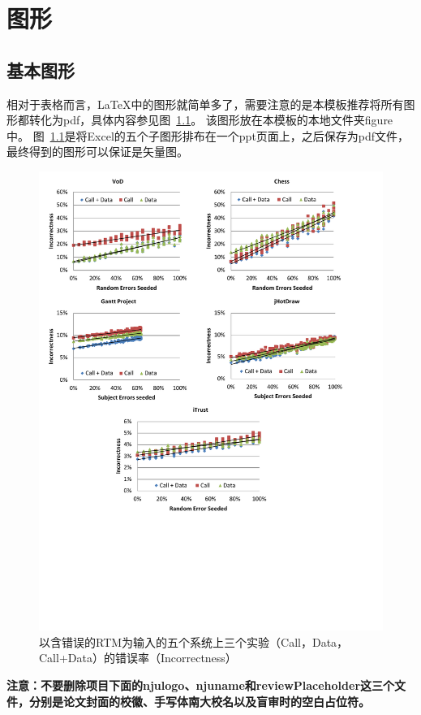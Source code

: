 \chapter{图形}

\section{基本图形}
相对于表格而言，LaTeX中的图形就简单多了，需要注意的是本模板推荐将所有图形都转化为pdf，具体内容参见图~\ref{fig_errorExpCH4}。
该图形放在本模板的本地文件夹figure中。
图~\ref{fig_errorExpCH4}是将Excel的五个子图形排布在一个ppt页面上，之后保存为pdf文件，最终得到的图形可以保证是矢量图。


\begin{figure}[htb]
  \centering
  \includegraphics[width=5in]{figure/chapter4/errorExpCH4.pdf}
  \caption{以含错误的RTM为输入的五个系统上三个实验（Call，Data，Call+Data）的错误率（Incorrectness）}\label{fig_errorExpCH4}
\end{figure}

\textbf{注意：不要删除项目下面的njulogo、njuname和reviewPlaceholder这三个文件，分别是论文封面的校徽、手写体南大校名以及盲审时的空白占位符。}

